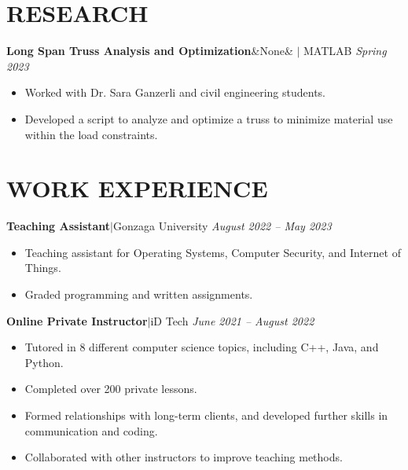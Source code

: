 \documentclass[11pt, a4paper, roman]{moderncv}
\newcommand{\project}[5]{
	\textbf{#1}\ifx\&#2\&{}
	\else
    		\href{#2}{\:\small\faGithub\:}\fi$|$ #3
	\hfill\textit{#4}
	#5
	\vspace{2mm}
}
\newcommand{\entry}[4]{
	\textbf{#2}\:$|$\:#1 
	\hfill\textit{#3}
	#4
	\vspace{2mm}
}
\begin{document}
\section{RESEARCH}
\project{Long Span Truss Analysis and Optimization}{None}{MATLAB}{Spring 2023}
{\begin{itemize}
\item Worked with Dr. Sara Ganzerli and civil engineering students.
\item Developed a script to analyze and optimize a truss to minimize material use within the load constraints.
\end{itemize}}
\vspace*{-2mm}
\section{WORK EXPERIENCE}
\entry{Gonzaga University}{Teaching Assistant}{August 2022 -- May 2023}
{\begin{itemize}
\item Teaching assistant for Operating Systems, Computer Security, and Internet of Things.
\item Graded programming and written assignments.
\end{itemize}}
\entry{iD Tech}{Online Private Instructor}{June 2021 -- August 2022}
{\begin{itemize}
\item Tutored in 8 different computer science topics, including C++, Java, and Python.
\item Completed over 200 private lessons.
\item Formed relationships with long-term clients, and developed further skills in communication and coding.
\item Collaborated with other instructors to improve teaching methods.
\end{itemize}}
\end{document}
